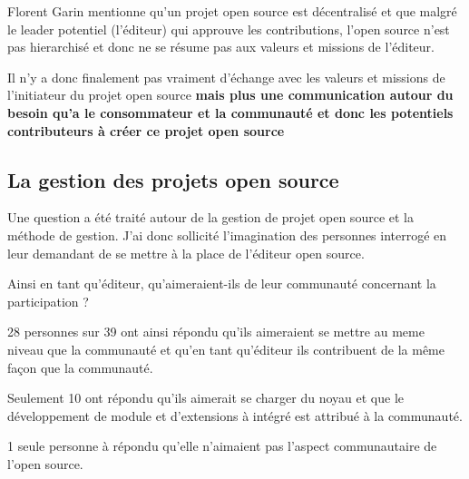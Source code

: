 			Florent Garin mentionne qu'un projet open source est décentralisé et que malgré le leader potentiel (l'éditeur) qui approuve les contributions, l'open source n'est pas hierarchisé et donc ne se résume pas aux valeurs et missions de l'éditeur.

			\begin{center}
				\textit{
				}
			\end{center}

			Il n'y a donc finalement pas vraiment d'échange avec les valeurs et missions de l'initiateur du projet open source \textbf{mais plus une communication autour du besoin qu'a le consommateur et la communauté et donc les potentiels contributeurs à créer ce projet open source}

		\subsection{La gestion des projets open source}

			Une question a été traité autour de la gestion de projet open source et la méthode de gestion.
			J'ai donc sollicité l'imagination des personnes interrogé en leur demandant de se mettre à la place de l'éditeur open source.

			Ainsi en tant qu'éditeur, qu'aimeraient-ils de leur communauté concernant la participation ?

			28 personnes sur 39 ont ainsi répondu qu'ils aimeraient se mettre au meme niveau que la communauté et qu'en tant qu'éditeur ils contribuent de la même façon que la communauté.

			Seulement 10 ont répondu qu'ils aimerait se charger du noyau et que le développement de module et d'extensions à intégré est attribué à la communauté.

			1 seule personne à répondu qu'elle n'aimaient pas l'aspect communautaire de l'open source.

